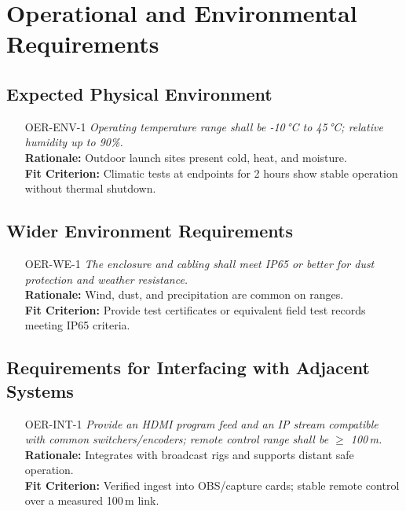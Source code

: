 \documentclass[12pt]{article}
\begin{document}
\section{Operational and Environmental Requirements}
\subsection{Expected Physical Environment}
\begin{itemize}[leftmargin=*]
  \item[OER-ENV-1] \emph{Operating temperature range shall be -10\,°C to 45\,°C;
          relative humidity up to 90\%.}\\ \textbf{Rationale:} Outdoor launch sites
        present cold, heat, and moisture.\\ \textbf{Fit Criterion:} Climatic tests at
        endpoints for 2 hours show stable operation without thermal shutdown.
\end{itemize}

\subsection{Wider Environment Requirements}
\begin{itemize}[leftmargin=*]
  \item[OER-WE-1] \emph{The enclosure and cabling shall meet IP65 or better for dust
          protection and weather resistance.}\\ \textbf{Rationale:} Wind, dust, and
        precipitation are common on ranges.\\ \textbf{Fit Criterion:} Provide test
        certificates or equivalent field test records meeting IP65 criteria.
\end{itemize}

\subsection{Requirements for Interfacing with Adjacent Systems}
\begin{itemize}[leftmargin=*]
  \item[OER-INT-1] \emph{Provide an HDMI program feed and an IP stream compatible with
          common switchers/encoders; remote control range shall be $\geq$ 100\,m.}\\
        \textbf{Rationale:} Integrates with broadcast rigs and supports distant safe
        operation.\\ \textbf{Fit Criterion:} Verified ingest into OBS/capture cards;
        stable remote control over a measured 100\,m link.
\end{itemize}
\end{document}
